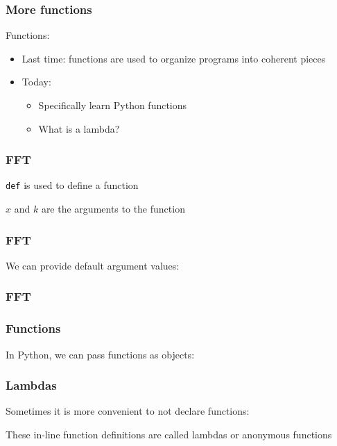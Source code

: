 \documentclass{beamer}
\begin{document}
\begin{frame}
\frametitle{More functions}

Functions:
\begin{itemize}
\setlength{\itemsep}{0.15in}
\item{Last time: functions are used to organize programs into coherent pieces}
\item{Today:
\begin{itemize}
  \setlength{\itemsep}{0.1in}
  \item{Specifically learn Python functions}
  \item{What is a lambda?}
\end{itemize}
}
\end{itemize}

\end{frame}

\begin{frame}
\frametitle{FFT}
\texttt{def} is used to define a function


$x$ and $k$ are the arguments to the function
\end{frame}

\begin{frame}
\frametitle{FFT}

We can provide default argument values:


\end{frame}


\begin{frame}
\frametitle{FFT}


\end{frame}

\begin{frame}
\frametitle{Functions}
In Python, we can pass functions as objects:


\end{frame}

\begin{frame}
\frametitle{Lambdas}

Sometimes it is more convenient to not declare functions:


These in-line function definitions are called lambdas or anonymous functions
\end{frame}
\end{document}
